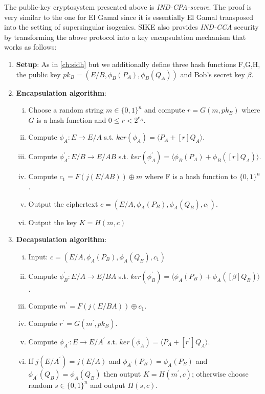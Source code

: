 The public-key cryptosystem presented above is \textit{IND-CPA-secure}. The proof is very similar to the one for El Gamal since it is essentially El Gamal transposed into the setting of supersingular isogenies. SIKE also provides \textit{IND-CCA} security by transforming the above protocol into a key encapsulation mechanism that works as follows:

\begin{enumerate}[(1)]
	\item \textbf{Setup}: As in \ref{ch:sidh} but we additionally define three hash functions F,G,H, the public key $pk_B=(E/B,\phi_B(P_A),\phi_B(Q_A))$ and Bob's secret key $\beta$.
	\item \textbf{Encapsulation algorithm}: 
	\begin{enumerate}[(i)]
		\item Choose a random string $m\in\{0,1\}^n$ and compute $r=G(m,pk_B)$ where $G$ is a hash function and $0\leq r < 2^{e_A}$.
		\item Compute $\phi_A:E \to E/A$ s.t. $ker(\phi_A) = \langle P_A + [r]Q_A \rangle$.
		\item Compute $\phi^{\prime}_A: E/B \to E/AB$ s.t. $ker(\phi^{\prime}_A) = \langle \phi_B(P_A) + \phi_B([r]Q_A) \rangle$.
		\item Compute $c_1=F(j(E/AB))\oplus m$ where F is a hash function to $\{0,1\}^n$.
		\item Output the ciphertext $c=(E/A,\phi_A(P_B),\phi_A(Q_B),c_1)$.
		\item Output the key $K=H(m,c)$
	\end{enumerate}
	\item \textbf{Decapsulation algorithm}: 
	\begin{enumerate}[(i)]
		\item Input: $c=(E/A,\phi_A(P_B),\phi_A(Q_B),c_1)$
		\item Compute $\phi^{\prime}_B: E/A \to E/BA$ s.t. $ker(\phi^{\prime}_B) = \langle \phi_A(P_B) + \phi_A([\beta]Q_B) \rangle$.
		\item Compute $m^{\prime}=F(j(E/BA))\oplus c_1$.
		\item Compute $r^{\prime}=G(m^{\prime},pk_B)$.
		\item Compute $\phi_{A^{\prime}}:E \to E/A^{\prime}$ s.t. $ker(\phi_A) = \langle P_A + [r^{\prime}]Q_A \rangle$.
		\item If $j(E/A^{\prime})=j(E/A)$ and $\phi_{A^{\prime}}(P_B) = \phi_{A}(P_B)$ and $\phi_{A^{\prime}}(Q_B) = \phi_{A}(Q_B)$ then output $K=H(m^{\prime},c)$; otherwise choose random $s\in\{0,1\}^n$ and output $H(s,c)$.

	\end{enumerate}
	
\end{enumerate}

